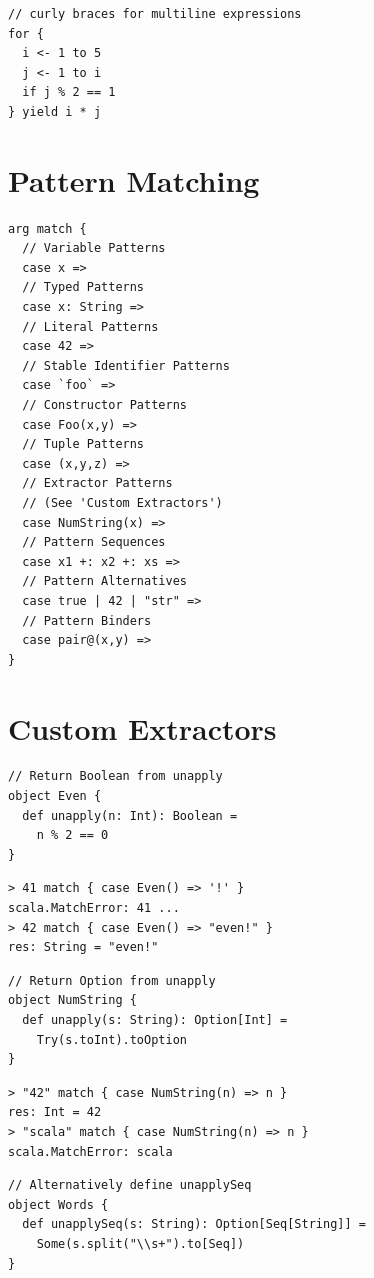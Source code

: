 \documentclass[10pt,landscape,a4paper]{article}
\begin{document}
\begin{multicols*}{4}
\begin{verbatim}
// curly braces for multiline expressions
for {
  i <- 1 to 5
  j <- 1 to i
  if j % 2 == 1
} yield i * j
\end{verbatim}
  \section{Pattern Matching}

\begin{verbatim}
arg match {
  // Variable Patterns
  case x =>
  // Typed Patterns
  case x: String =>
  // Literal Patterns
  case 42 =>
  // Stable Identifier Patterns
  case `foo` =>
  // Constructor Patterns
  case Foo(x,y) =>
  // Tuple Patterns
  case (x,y,z) =>
  // Extractor Patterns
  // (See 'Custom Extractors')
  case NumString(x) =>
  // Pattern Sequences
  case x1 +: x2 +: xs =>
  // Pattern Alternatives
  case true | 42 | "str" =>
  // Pattern Binders
  case pair@(x,y) =>
}
\end{verbatim}

  \section{Custom Extractors}

\begin{verbatim}
// Return Boolean from unapply
object Even {
  def unapply(n: Int): Boolean =
    n % 2 == 0
}
\end{verbatim}

\begin{verbatim}
> 41 match { case Even() => '!' }
scala.MatchError: 41 ...
> 42 match { case Even() => "even!" }
res: String = "even!"
\end{verbatim}

\begin{verbatim}
// Return Option from unapply
object NumString {
  def unapply(s: String): Option[Int] =
    Try(s.toInt).toOption
}
\end{verbatim}

\begin{verbatim}
> "42" match { case NumString(n) => n }
res: Int = 42
> "scala" match { case NumString(n) => n }
scala.MatchError: scala
\end{verbatim}

\begin{verbatim}
// Alternatively define unapplySeq
object Words {
  def unapplySeq(s: String): Option[Seq[String]] =
    Some(s.split("\\s+").to[Seq])
}
\end{verbatim}


\end{multicols*}
\end{document}
